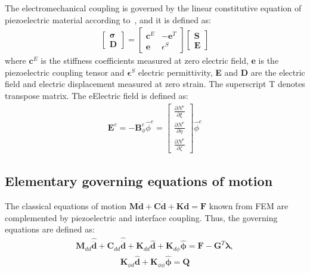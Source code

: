 \documentclass[a4paper,fleqn]{cas-sc}
\begin{document}
The electromechanical coupling is governed by the linear constitutive equation of piezoelectric material according to~\cite{giurgiutiumicromechatronics, rekatsinas2017cubic}, and it is defined as:
\begin{eqnarray}
	\left [ 
	\begin {array}{c}
	\boldsymbol{\sigma}\\
	\textbf{D}
\end{array}\right ]=
\left [ 
\begin{array}{cc}
	\textbf{c}^E & -\textbf{e}^T \\
	\textbf{e} & \epsilon^S 
\end{array} \right ]
\left[ 
\begin{array}{c}
	\textbf{S}\\
	\textbf{E} 
\end{array} \right ]
\end{eqnarray}
where \(\textbf{c}^E\) is the stiffness coefficients measured at zero electric field, \textbf{e} is the piezoelectric coupling tensor and \(\boldsymbol{\epsilon}^S\) electric permittivity, \textbf{E} and \textbf{D} are the electric field and electric displacement measured at zero strain.
The superscript T denotes transpose matrix.
The eElectric field is defined as:
\begin{eqnarray}
\textbf{E}^e=-\textbf{B}_\phi^e \widehat{\phi}^e = \left[ \begin{array}{c}
	\frac{\partial N^e}{\partial \xi}\\
	\frac{\partial N^e}{\partial \eta}\\
	\frac{\partial N^e}{\partial \zeta}
\end{array} \right] \widehat{\phi}^e
\end{eqnarray}
\subsection{Elementary governing equations of motion}
\label{sec:motion}
The classical equations of motion \(\textbf{M}\ddot{\textbf{d}} + \textbf{C}\dot{\textbf{d}} + \textbf{K}\textbf{d} = \textbf{F}\) known from FEM are complemented by piezoelectric and interface coupling. Thus, the governing equations are defined as:
\begin{eqnarray}
	\textbf{M}_{dd} \widehat{\ddot{\textbf{d}}} + \textbf{C}_{dd} \widehat{\dot{\textbf{d}}} + \textbf{K}_{dd} \widehat{\textbf{d}} + \textbf{K}_{d\phi} \widehat{\boldsymbol{\phi}} = \textbf{F} - \textbf{G}^T \boldsymbol{\lambda},
	\label{eq:motion}
\end{eqnarray}
\begin{eqnarray}
	\textbf{K}_{\phi d}\widehat{\textbf{d}} + \textbf{K}_{\phi \phi} \widehat{\boldsymbol{\phi}} = \textbf{Q}
	\label{eq:piezocoupling}
\end{eqnarray} 
\end{document}
